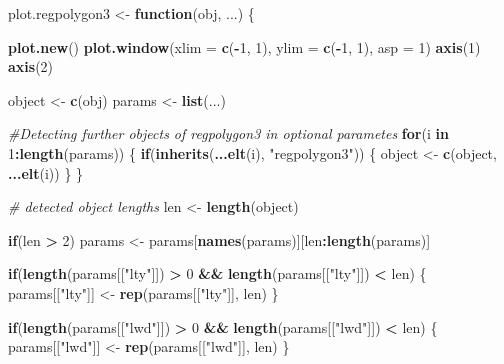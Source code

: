 \documentclass[]{article}
\newenvironment{Shaded}{\begin{snugshade}}{\end{snugshade}}
\newcommand{\KeywordTok}[1]{\textcolor[rgb]{0.13,0.29,0.53}{\textbf{#1}}}
\newcommand{\DataTypeTok}[1]{\textcolor[rgb]{0.13,0.29,0.53}{#1}}
\newcommand{\DecValTok}[1]{\textcolor[rgb]{0.00,0.00,0.81}{#1}}
\newcommand{\StringTok}[1]{\textcolor[rgb]{0.31,0.60,0.02}{#1}}
\newcommand{\CommentTok}[1]{\textcolor[rgb]{0.56,0.35,0.01}{\textit{#1}}}
\newcommand{\ControlFlowTok}[1]{\textcolor[rgb]{0.13,0.29,0.53}{\textbf{#1}}}
\newcommand{\OperatorTok}[1]{\textcolor[rgb]{0.81,0.36,0.00}{\textbf{#1}}}
\newcommand{\NormalTok}[1]{#1}
\begin{document}
\begin{Shaded}
\begin{Highlighting}[]
\NormalTok{plot.regpolygon3 <-}\StringTok{ }\ControlFlowTok{function}\NormalTok{(obj, ...) \{}
  
  \KeywordTok{plot.new}\NormalTok{()}
  \KeywordTok{plot.window}\NormalTok{(}\DataTypeTok{xlim =} \KeywordTok{c}\NormalTok{(}\OperatorTok{-}\DecValTok{1}\NormalTok{, }\DecValTok{1}\NormalTok{), }\DataTypeTok{ylim =} \KeywordTok{c}\NormalTok{(}\OperatorTok{-}\DecValTok{1}\NormalTok{, }\DecValTok{1}\NormalTok{), }\DataTypeTok{asp =} \DecValTok{1}\NormalTok{)}
  \KeywordTok{axis}\NormalTok{(}\DecValTok{1}\NormalTok{)}
  \KeywordTok{axis}\NormalTok{(}\DecValTok{2}\NormalTok{)}
  
\NormalTok{  object <-}\StringTok{ }\KeywordTok{c}\NormalTok{(obj)}
\NormalTok{  params <-}\StringTok{ }\KeywordTok{list}\NormalTok{(...)}
  
  \CommentTok{#Detecting further objects of regpolygon3 in optional parametes}
  \ControlFlowTok{for}\NormalTok{(i }\ControlFlowTok{in} \DecValTok{1}\OperatorTok{:}\KeywordTok{length}\NormalTok{(params)) \{}
    \ControlFlowTok{if}\NormalTok{(}\KeywordTok{inherits}\NormalTok{(}\KeywordTok{...elt}\NormalTok{(i), }\StringTok{"regpolygon3"}\NormalTok{)) \{}
\NormalTok{      object <-}\StringTok{ }\KeywordTok{c}\NormalTok{(object, }\KeywordTok{...elt}\NormalTok{(i))}
\NormalTok{    \}}
\NormalTok{  \}}
  
  
  \CommentTok{# detected object lengths}
\NormalTok{  len <-}\StringTok{ }\KeywordTok{length}\NormalTok{(object)}
  
  \ControlFlowTok{if}\NormalTok{(len }\OperatorTok{>}\StringTok{ }\DecValTok{2}\NormalTok{)}
\NormalTok{    params <-}\StringTok{ }\NormalTok{params[}\KeywordTok{names}\NormalTok{(params)][len}\OperatorTok{:}\KeywordTok{length}\NormalTok{(params)]}
  
  \ControlFlowTok{if}\NormalTok{(}\KeywordTok{length}\NormalTok{(params[[}\StringTok{"lty"}\NormalTok{]]) }\OperatorTok{>}\StringTok{ }\DecValTok{0} \OperatorTok{&&}\StringTok{ }\KeywordTok{length}\NormalTok{(params[[}\StringTok{"lty"}\NormalTok{]]) }\OperatorTok{<}\StringTok{ }\NormalTok{len) \{}
\NormalTok{    params[[}\StringTok{"lty"}\NormalTok{]] <-}\StringTok{ }\KeywordTok{rep}\NormalTok{(params[[}\StringTok{"lty"}\NormalTok{]], len)}
\NormalTok{  \}}
  
  \ControlFlowTok{if}\NormalTok{(}\KeywordTok{length}\NormalTok{(params[[}\StringTok{"lwd"}\NormalTok{]]) }\OperatorTok{>}\StringTok{ }\DecValTok{0} \OperatorTok{&&}\StringTok{ }\KeywordTok{length}\NormalTok{(params[[}\StringTok{"lwd"}\NormalTok{]]) }\OperatorTok{<}\StringTok{ }\NormalTok{len) \{}
\NormalTok{    params[[}\StringTok{"lwd"}\NormalTok{]] <-}\StringTok{ }\KeywordTok{rep}\NormalTok{(params[[}\StringTok{"lwd"}\NormalTok{]], len)}
\NormalTok{  \}}
  

\end{Highlighting}
\end{Shaded}
\end{document}
